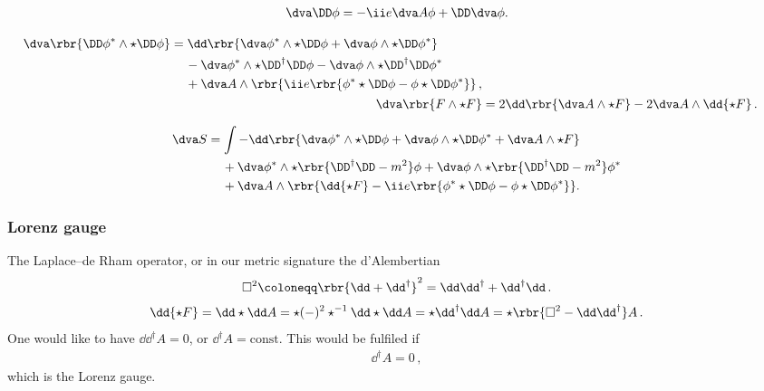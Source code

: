 \documentclass[a4paper]{article}
\begin{document}
\begin{align}
\dva \DD\phi = -\ii e \dva A\phi + \DD \dva \phi.
\end{align}

\begin{align}
\begin{split}
\dva \rbr{\DD \phi^*\wedge\star\DD\phi} &= 
\dd\rbr{\dva\phi^*\wedge\star\DD\phi + \dva\phi\wedge\star\DD\phi^*}
\\
&\quad\,-
\dva\phi^*\wedge\star\DD^{\dagger}\DD\phi -
\dva\phi\wedge\star\DD^{\dagger}\DD\phi^*
\\
&\quad\,+
\dva A \wedge\rbr{\ii e \rbr{\phi^* \star\DD\phi - \phi\star\DD\phi^*}}\,,
\end{split}
\\
\dva \rbr{F\wedge\star F} &=
	2 \dd\rbr{\dva A \wedge \star F} - 2 \dva A \wedge \dd {\star F}\,.
\end{align}

\begin{align}
\dva S &=
\int -\dd\rbr{\dva\phi^*\wedge\star\DD\phi +
\dva\phi\wedge\star\DD\phi^* + \dva A \wedge\star F}
\nonumber \\
&\quad\,+
\dva\phi^*\wedge\star\rbr{\DD^{\dagger}\DD-m^2}\phi +
\dva\phi\wedge\star\rbr{\DD^{\dagger}\DD-m^2}\phi^*
\nonumber \\
&\quad\,+
\dva A\wedge\rbr{\dd{\star F} -
	\ii e \rbr{\phi^* \star\DD\phi - \phi \star\DD\phi^*}}.
\end{align}

\subsubsection{Lorenz gauge}
The Laplace--de Rham operator, or in our metric signature the d'Alembertian
\begin{align}
\square^2 \coloneqq \rbr{\dd + \dd^{\dagger}}^2 =
	\dd \dd^{\dagger} + \dd^{\dagger} \dd\,.
\end{align}
\begin{align}
\dd{\star F} = \dd\star \dd A = \star (-)^2 \star^{-1}\dd\star\dd A =
	\star \dd^{\dagger} \dd A = \star\rbr{\square^2 - \dd \dd^{\dagger}} A\,.
\end{align}
One would like to have $\dd \dd^{\dagger} A = 0$, or $\dd^{\dagger} A = 
\text{const}$. This would be fulfiled if
\begin{align}
\dd^{\dagger} A = 0\,,
\end{align}
which is the Lorenz gauge\cite{Lorenz1867,Bladel1991a,Bladel1991b}.
\end{document}
